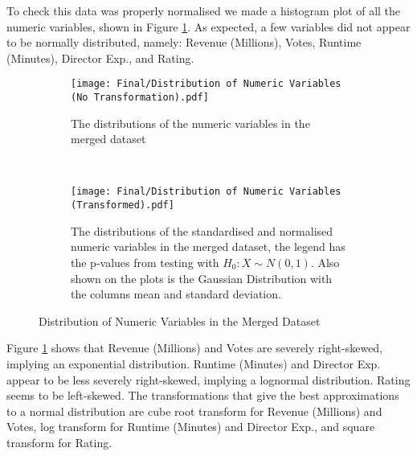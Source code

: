         To check this data was properly normalised we made a histogram plot of all the
            numeric variables, shown in Figure \ref{fig-distribution-of-numeric-variable}.
        As expected, a few variables did not appear to be normally distributed, namely:
        Revenue (Millions), Votes, Runtime (Minutes), Director Exp., and Rating.
        \begin{figure}[H]
            \centering
            \begin{subfigure}[b]{0.75\textwidth}
                \centering
                \texttt{[image: Final/Distribution of Numeric Variables (No Transformation).pdf]}
            \end{subfigure}
            \begin{subfigure}[b]{0.2\textwidth}
                \centering
                \captionsetup{justification=justified,singlelinecheck=false}
                \caption{The distributions of the numeric variables in the merged dataset}\label{fig-distribution-of-numeric-variable}
            \end{subfigure}
            \\
            \begin{subfigure}[b]{0.75\textwidth}
                \centering
                \texttt{[image: Final/Distribution of Numeric Variables (Transformed).pdf]}
            \end{subfigure}
            \begin{subfigure}[b]{0.2\textwidth}
                \centering
                \captionsetup{justification=justified,singlelinecheck=false}
                \caption{The distributions of the standardised and normalised numeric variables
                        in the merged dataset, the legend has the p-values from testing with 
                        $H_{0}: X \sim N(0,1)$. Also shown on the plots is the Gaussian Distribution
                        with the columns mean and standard deviation.}
                \label{fig-transformed-distribution-of-numeric-variable}
            \end{subfigure}
            \caption{Distribution of Numeric Variables in the Merged Dataset}
            \label{fig-numeric-variable-distribution}
        \end{figure}
                  
        Figure \ref*{fig-distribution-of-numeric-variable} shows that Revenue (Millions) and Votes are
        severely right-skewed, implying an exponential distribution. Runtime
        (Minutes) and Director Exp. appear to be less severely right-skewed,
        implying a lognormal distribution. Rating seems to be left-skewed. The
        transformations that give the best approximations to a normal
        distribution are cube root transform for Revenue (Millions) and Votes,
        log transform for Runtime (Minutes) and Director Exp., and square
        transform for Rating.
        
